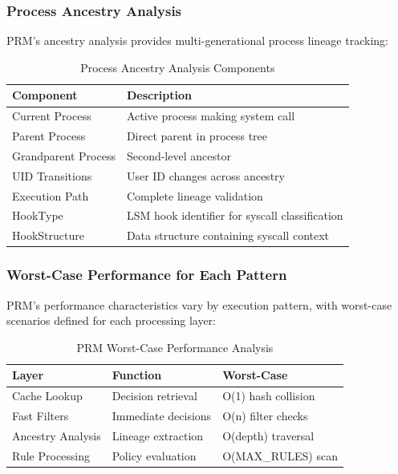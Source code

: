 \documentclass[]{sn-jnl}
\begin{document}
\subsubsection{Process Ancestry Analysis}

PRM's ancestry analysis provides multi-generational process lineage tracking:

\begin{table}[htbp]
\centering
\caption{Process Ancestry Analysis Components}
\label{tab:ancestry}
\begin{tabular}{@{}p{2.5cm}p{5cm}@{}}
\toprule
\textbf{Component} & \textbf{Description} \\
\midrule
Current Process   & Active process making system call \\
Parent Process    & Direct parent in process tree \\
Grandparent Process & Second-level ancestor \\
UID Transitions   & User ID changes across ancestry \\
Execution Path    & Complete lineage validation \\
HookType          & LSM hook identifier for syscall classification \\
HookStructure     & Data structure containing syscall context \\
\bottomrule
\end{tabular}
\end{table}

\subsubsection{Worst-Case Performance for Each Pattern}

PRM's performance characteristics vary by execution pattern, with worst-case
scenarios defined for each processing layer:

\begin{table}[htbp]
\centering
\caption{PRM Worst-Case Performance Analysis}
\label{tab:performance}
\begin{tabular}{@{}p{2cm}p{3cm}p{2.5cm}@{}}
\toprule
\textbf{Layer} & \textbf{Function} & \textbf{Worst-Case} \\
\midrule
Cache Lookup     & Decision retrieval  & O(1) hash collision \\
Fast Filters     & Immediate decisions & O(n) filter checks \\
Ancestry Analysis & Lineage extraction & O(depth) traversal \\
Rule Processing  & Policy evaluation   & O(MAX\_RULES) scan \\
\bottomrule
\end{tabular}
\end{table}
\end{document}
